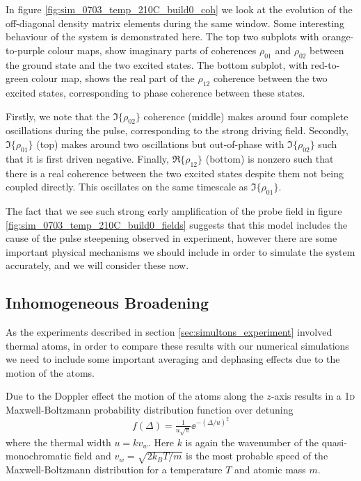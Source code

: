     In figure \ref{fig:sim_0703_temp_210C_build0_coh} we look at the evolution
    of the off-diagonal density matrix elements during the same window. Some
    interesting behaviour of the system is demonstrated here. The top two
    subplots with orange-to-purple colour maps, show imaginary parts of
    coherences $\rho_{01}$ and $\rho_{02}$ between the ground state and the two
    excited states. The bottom subplot, with red-to-green colour map, shows the
    real part of the $\rho_{12}$ coherence between the two excited states,
    corresponding to phase coherence between these states.

    Firstly, we note that the $\Im\{\rho_{02}\}$ coherence (middle) makes around
    four complete oscillations during the pulse, corresponding to the strong
    driving field. Secondly, $\Im\{\rho_{01}\}$ (top) makes around two
    oscillations but out-of-phase with $\Im\{\rho_{02}\}$ such that it is first
    driven negative. Finally, $\Re\{\rho_{12}\}$ (bottom) is nonzero such that
    there is a real coherence between the two excited states despite them not
    being coupled directly. This oscillates on the same timescale as
    $\Im\{\rho_{01}\}$.

    The fact that we see such strong early amplification of the probe field in
    figure \ref{fig:sim_0703_temp_210C_build0_fields} suggests that this model
    includes the cause of the pulse steepening observed in experiment, however
    there are some important physical mechanisms we should include in order to
    simulate the system accurately, and we will consider these now.

  \subsection{Inhomogeneous Broadening}

    As the experiments described in section \ref{sec:simultons_experiment}
    involved thermal atoms, in order to compare these results with our numerical
    simulations we need to include some important averaging and dephasing
    effects due to the motion of the atoms.

    Due to the Doppler effect the motion of the atoms along
    the $z$-axis results in a \textsc{1d} Maxwell-Boltzmann probability
    distribution function over detuning\cite{foot2005atomic, Gea-Banacloche1995}
    \begin{equation}\label{eqn:max_boltz}
      f(\Delta) = \tfrac{1}{u \sqrt{\pi}} \ee^{-(\Delta/u)^2}
    \end{equation}
    where the thermal width $u = k v_w$. Here $k$ is again the wavenumber of the
    quasi-monochromatic field and $v_w = \sqrt{2 k_B T/m}$ is the most probable
    speed of the Maxwell-Boltzmann distribution for a temperature $T$ and atomic
    mass $m$.\cite{2007introduction}

